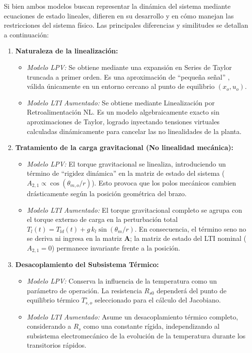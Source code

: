 \documentclass[12pt, a4paper,journal, onecolumn, compsoc]{IEEEtran}
\begin{document}
Si bien ambos modelos buscan representar la dinámica del sistema mediante ecuaciones de estado lineales, difieren en su desarrollo y en cómo manejan las restricciones del sistema físico. Las principales diferencias y similitudes se detallan a continuación:

\begin{enumerate}
    \item \textbf{Naturaleza de la linealización:}
    \begin{itemize}
        \item \textit{Modelo LPV:} Se obtiene mediante una expansión en Series de Taylor truncada a primer orden. Es una aproximación de ``pequeña señal'' \cite{franklin_feedback}, válida únicamente en un entorno cercano al punto de equilibrio $(x_o, u_o)$.
        \item \textit{Modelo LTI Aumentado:} Se obtiene mediante Linealización por Retroalimentación NL. Es un modelo algebraicamente exacto sin aproximaciones de Taylor, logrado inyectando tensiones virtuales calculadas dinámicamente para cancelar las no linealidades de la planta.
    \end{itemize}
    
    \item \textbf{Tratamiento de la carga gravitacional (No linealidad mecánica):}
    \begin{itemize}
        \item \textit{Modelo LPV:} El torque gravitacional se linealiza, introduciendo un término de ``rigidez dinámica'' en la matriz de estado del sistema ($A_{2,1} \propto \cos(\theta_{m,o}/r)$). Esto provoca que los polos mecánicos cambien drásticamente según la posición geométrica del brazo.
        \item \textit{Modelo LTI Aumentado:} El torque gravitacional completo se agrupa con el torque externo de carga en la perturbación total $T_l(t)=T_{ld}(t)+g\,k_l\sin(\theta_m/r)$. En consecuencia, el término seno no se deriva ni ingresa en la matriz $\mathbf{A}$; la matriz de estado del LTI nominal ($A_{2,1}=0$) permanece invariante frente a la posición.
    \end{itemize}

    \item \textbf{Desacoplamiento del Subsistema Térmico:}
    \begin{itemize}
        \item \textit{Modelo LPV:} Conserva la influencia de la temperatura como un parámetro de operación. La resistencia $R_{s0}$ dependerá del punto de equilibrio térmico $T_{s,o}^\circ$ seleccionado para el cálculo del Jacobiano.
        \item \textit{Modelo LTI Aumentado:} Asume un desacoplamiento térmico completo, considerando a $R_s$ como una constante rígida, independizando al subsistema electromecánico de la evolución de la temperatura durante los transitorios rápidos.
    \end{itemize}


\end{enumerate}
\end{document}
